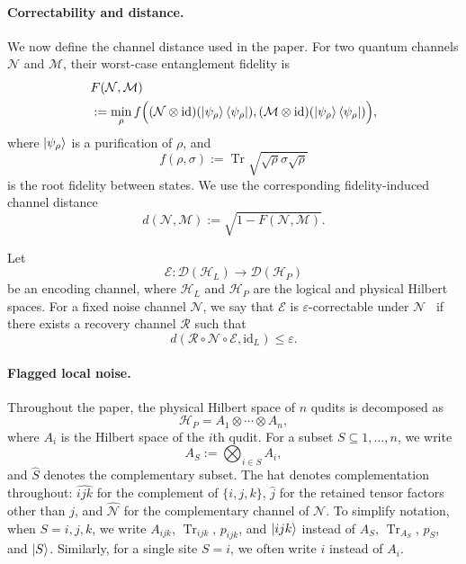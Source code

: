 \documentclass[10pt,twocolumn,superscriptaddress,aps,amsmath,amssymb,citeautoscript,floatfix,prx]{revtex4-2}
\theoremstyle{plain}
\theoremstyle{plain}
\theoremstyle{plain}
\theoremstyle{plain}
\theoremstyle{plain}
\theoremstyle{plain}
\theoremstyle{plain}
\theoremstyle{definition}
\theoremstyle{plain}
\begin{document}
\paragraph{Correctability and distance.}

We now define the channel distance used in the paper. For two quantum channels $\mathcal N$ and $\mathcal M$, their worst-case entanglement fidelity is
$$
\begin{aligned}
&F(\mathcal N,\mathcal M)
\\
&:=
\min_\rho
f\Big(
(\mathcal N\otimes\mathrm{id})
(\ket{\psi_\rho}\bra{\psi_\rho}),
(\mathcal M\otimes\mathrm{id})
(\ket{\psi_\rho}\bra{\psi_\rho})
\Big),
\end{aligned}
$$
where $\ket{\psi_\rho}$ is a purification of $\rho$, and
$$
f(\rho,\sigma)
:=
\operatorname{Tr}
\sqrt{\sqrt\rho\sigma\sqrt\rho}
$$
is the root fidelity between states. We use the corresponding fidelity-induced channel distance
\begin{equation}\label{eq:distance_def}
d(\mathcal N,\mathcal M)
:=
\sqrt{1-F(\mathcal N,\mathcal M)} .
\end{equation}

Let
$$
\mathcal E:
\mathcal D(\mathcal H_L)
\to
\mathcal D(\mathcal H_P)
$$
be an encoding channel, where $\mathcal H_L$ and $\mathcal H_P$ are the logical and physical Hilbert spaces. 
For a fixed noise channel $\mathcal N$, we say that $\mathcal E$ is $\varepsilon$-correctable under $\mathcal N$~\cite{Beny2010} 
if there exists a recovery channel $\mathcal R$ such that
$$
d(\mathcal R\circ\mathcal N\circ\mathcal E,\mathrm{id}_L)
\le
\varepsilon .
$$

\paragraph{Flagged local noise.}

Throughout the paper, the physical Hilbert space of $n$ qudits is decomposed as
$$
\mathcal H_P
=
A_1\otimes\cdots\otimes A_n,
$$
where $A_i$ is the Hilbert space of the $i$th qudit. For a subset $S\subseteq{1,\ldots,n}$, we write
$$
A_S
:=
\bigotimes_{i\in S}A_i,
$$
and $\hat S$ denotes the complementary subset. The hat denotes complementation throughout: $\widehat{ijk}$ for the complement of $\{i,j,k\}$, $\widehat j$ for the retained tensor factors other than $j$, 
and $\widehat{\mathcal N}$ for the complementary channel of $\mathcal N$. 
To simplify notation, when $S={i,j,k}$, we write $A_{ijk}$, $\operatorname{Tr}_{ijk}$, $p_{ijk}$, and $\ket{ijk}$ instead of $A_S$, $\operatorname{Tr}_{A_S}$, $p_S$, and $\ket S$. 
Similarly, for a single site $S={i}$, we often write $i$ instead of $A_i$.
\end{document}
